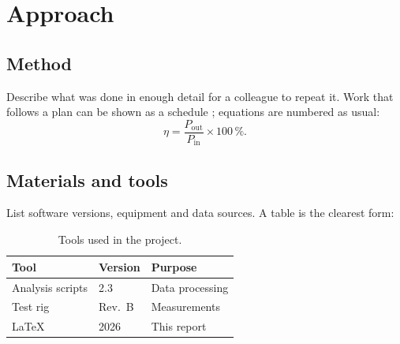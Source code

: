 \chapter{Approach}
\label{ch:approach}

\section{Method}
Describe what was done in enough detail for a colleague to repeat it. Work that follows a
plan can be shown as a schedule \cite{gantt1919}; equations are numbered as usual:
\begin{equation}
  \eta = \frac{P_{\mathrm{out}}}{P_{\mathrm{in}}} \times 100\,\% .
  \label{eq:efficiency}
\end{equation}

\section{Materials and tools}
List software versions, equipment and data sources. A table is the clearest form:

\begin{table}[ht]
  \centering
  \caption{Tools used in the project.}
  \label{tab:tools}
  \begin{tabular}{@{}lll@{}}
    \toprule
    Tool & Version & Purpose \\
    \midrule
    Analysis scripts & 2.3 & Data processing \\
    Test rig         & Rev.\ B & Measurements \\
    \LaTeX{} \cite{lamport94} & 2026 & This report \\
    \bottomrule
  \end{tabular}
\end{table}
